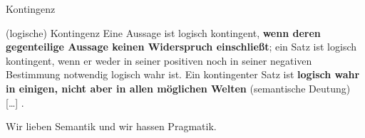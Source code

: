 \begin{frame}{Kontingenz}

\begin{block}{(logische) Kontingenz}
	Eine Aussage ist logisch kontingent, \textbf{wenn deren gegenteilige Aussage keinen Widerspruch einschließt}; ein Satz ist logisch kontingent, wenn er weder in seiner positiven noch in seiner negativen Bestimmung notwendig logisch wahr ist. Ein kontingenter Satz ist \textbf{logisch wahr in einigen, nicht aber in allen  möglichen Welten} (semantische Deutung) [\dots] \citep{Prechtl16b}.
\end{block}

\ea Wir lieben Semantik und wir hassen Pragmatik.
\z 

\pause 

\begin{table}
	\centering	
\end{table} 

\end{frame}


%
%	
%		
%		
%	
%	
%
%		
%	
%	
%
%
%	
%


